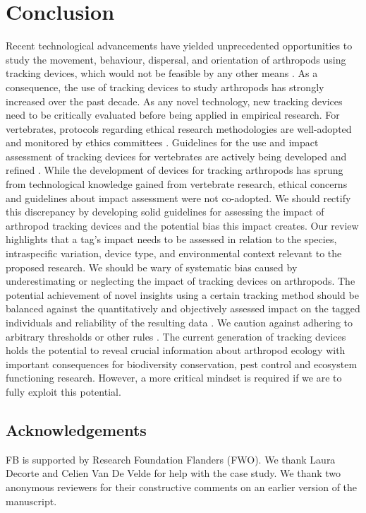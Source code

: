 \documentclass[10pt, twoside]{book} %
\begin{document}
	\section{Conclusion}
	Recent technological advancements have yielded unprecedented opportunities to study the movement, behaviour, dispersal, and orientation of arthropods using tracking devices, which would not be feasible by any other means \citep{kissling2014}. As a consequence, the use of tracking devices to study arthropods has strongly increased over the past decade. As any novel technology, new tracking devices need to be critically evaluated before being applied in empirical research. For vertebrates, protocols regarding ethical research methodologies are well-adopted and monitored by ethics committees \citep{kays2015, drinkwater2019}. Guidelines for the use and impact assessment of tracking devices for vertebrates are actively being developed and refined \citep{barron2010, mcintyre2015, portugal2018, geen2019}. While the development of devices for tracking arthropods has sprung from technological knowledge gained from vertebrate research, ethical concerns and guidelines about impact assessment were not co-adopted. We should rectify this discrepancy by developing solid guidelines for assessing the impact of arthropod tracking devices and the potential bias this impact creates. Our review highlights that a tag's impact needs to be assessed in relation to the species, intraspecific variation, device type, and environmental context relevant to the proposed research. We should be wary of systematic bias caused by underestimating or neglecting the impact of tracking devices on arthropods. The potential achievement of novel insights using a certain tracking method should be balanced against the quantitatively and objectively assessed impact on the tagged individuals and reliability of the resulting data \citep{barron2010, kays2015}. We caution against adhering to arbitrary thresholds or other rules \citep{portugal2018}. The current generation of tracking devices holds the potential to reveal crucial information about arthropod ecology with important consequences for biodiversity conservation, pest control and ecosystem functioning research. However, a more critical mindset is required if we are to fully exploit this potential.\\
	\vspace*{\fill}
	\clearpage
	
	\subsection*{Acknowledgements}
	FB is supported by Research Foundation Flanders (FWO). We thank Laura Decorte and Celien Van De Velde for help with the case study. We thank two anonymous reviewers for their constructive comments on an earlier version of the manuscript.
\end{document}
